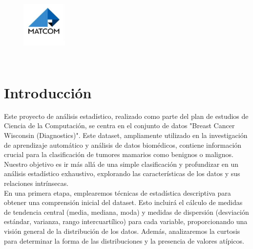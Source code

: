 \documentclass[a4paper, 12pt]{article}
\begin{document}
\graphicspath{{./}}

\begin{center}
\\
\vspace {0.5cm}
\\
\vspace {0.5cm}
\\
\vspace {5cm}
\\
\\
\vspace {1cm}
\vspace {2cm}
\\
\vspace {0.5cm}
\\
\\
\vspace {0.5cm}
\begin{figure}[h]
    \centering
    \includegraphics[width=0.2\textwidth, height=0.2\textheight]{MATCOM.jpg}
\end{figure}
\vspace {0.5cm}
\\


\end{center}

\newpage
\tableofcontents
\newpage

\section{Introducción}

Este proyecto de análisis estadístico, realizado como parte del plan de estudios de Ciencia de la Computación, se centra en el conjunto de datos "Breast Cancer Wisconsin (Diagnostics)". Este dataset, ampliamente utilizado en la investigación de aprendizaje automático y análisis de datos biomédicos, contiene información crucial para la clasificación de tumores mamarios como benignos o malignos. Nuestro objetivo es ir más allá de una simple clasificación y profundizar en un análisis estadístico exhaustivo, explorando las características de los datos y sus relaciones intrínsecas.\\

En una primera etapa, emplearemos técnicas de estadística descriptiva para obtener una comprensión inicial del dataset. Esto incluirá el cálculo de medidas de tendencia central (media, mediana, moda) y medidas de dispersión (desviación estándar, varianza, rango intercuartílico) para cada variable, proporcionando una visión general de la distribución de los datos. Además, analizaremos la curtosis para determinar la forma de las distribuciones y la presencia de valores atípicos.\\
\end{document}
